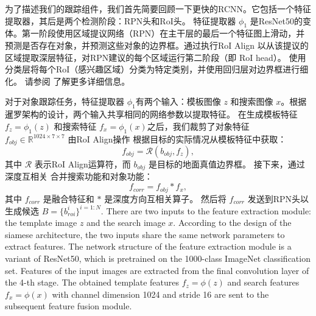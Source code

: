 
为了描述我们的跟踪组件，我们首先简要回顾一下更快的RCNN。它包括一个特征提取器，其后是两个检测阶段：RPN头和RoI头。
特征提取器 $\phi_{1}$ 是ResNet50的变体。第一阶段使用区域提议网络（RPN）在主干层的最后一个特征图上滑动，并预测是否存在对象，并预测这些对象的边界框。通过执行RoI Align \cite{He2018MaskR} 以从该提议的区域提取深层特征，对RPN建议的每个区域运行第二阶段（即 RoI head）。
使用分类层将每个RoI（感兴趣区域）分类为特定类别，并使用回归层对边界框进行细化。
请参阅 \cite{ren2015faster} 了解更多详细信息。

对于对象跟踪任务，特征提取器 $\phi_{1}$有两个输入：模板图像 $z$ 和搜索图像 $x$。根据暹罗架构的设计，两个输入共享相同的网络参数以提取特征。
在生成模板特征 $f_{z} = \phi_{1}(z)$ 和搜索特征 $f_{x} = \phi_{1}(x)$之后，我们裁剪了对象特征 $f_{obj} \in \mathbb{R}^{1024 \times 7 \times 7}$ 由RoI Align操作 \cite{He2018MaskR} 根据目标的实际情况从模板特征中获取：
\begin{equation}
    f_{obj} = \mathcal{R}(b_{obj}, f_{z}),
\end{equation}
其中 $\mathcal{R}$ 表示RoI Align运算符，而 $b_{obj}$ 是目标的地面真值边界框。
接下来，通过深度互相关 \cite{SiamRPN++} 合并搜索功能和对象功能：
\begin{equation}
    f_{corr} = f_{obj} * f_{x},
\end{equation}
其中 $f_{corr}$ 是融合特征和 $*$ 是深度方向互相关算子。
然后将 $f_{corr}$ 发送到RPN头以生成候选 $B=\{b^{i}_{roi}\}^{i=1:N}$.
\iffalse
There are two inputs to the feature extraction module: the template image $z$ and the search image $x$. According to the design of the siamese architecture, the two inputs share the same network parameters to extract features.
The network structure of the feature extraction module is a variant of ResNet50, which is pretrained on the 1000-class ImageNet classification set. Features of the input images are extracted from the final convolution layer of the 4-th stage. The obtained template features $f_{z} = \phi(z)$ and search features $f_{x} = \phi(x)$ with channel dimension 1024 and stride 16 are sent to the subsequent feature fusion module.

